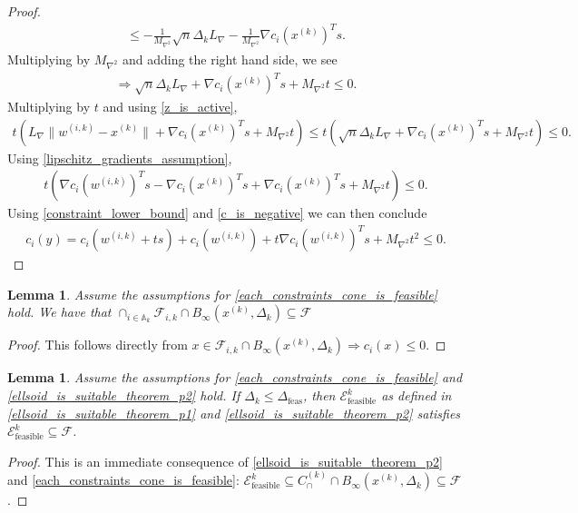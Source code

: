 \documentclass{article}
\newtheorem{lemma}[theorem]{Lemma}
\theoremstyle{case}
\newcommand{\activeconstraintsk}{{\mathbb A_{k}}}
\newcommand{\capcones}{{C^{(k)}_{\cap}}}
\newcommand{\dfeas}{{\Delta_{\text{feas}}}}
\newcommand{\dk}{\Delta_k}
\newcommand{\feasible}{{\mathcal F}}
\newcommand{\fik}{{\mathcal F_{i, k}}}
\newcommand{\lipgrad}{{L_{\nabla}}}
\newcommand{\maxhessian}{{M_{\nabla^2}}}
\newcommand{\tr}{{ B_{\infty}\left(\xk, \dk\right) }}
\newcommand{\unshiftedellipsoid}{{\mathcal E^k_{\text{feasible}}}}
\newcommand{\wik}{{w^{(i, k)}}}
\newcommand{\xk}{{x^{(k)}}}
\begin{document}
\begin{proof}
\begin{align*}
\le -\frac 1 \maxhessian \sqrt{n}\dk \lipgrad -\frac 1 \maxhessian \nabla c_i(\xk)^Ts.
\end{align*}
Multiplying by $\maxhessian$ and adding the right hand side, we see
\begin{align*}
\Longrightarrow \sqrt{n}\dk \lipgrad + \nabla c_i(\xk)^Ts + \maxhessian t \le 0.
\end{align*}
Multiplying by $t$ and using \cref{z_is_active},
\begin{align*}
 t \left(\lipgrad\|\wik - \xk\| + \nabla c_i(\xk)^Ts + \maxhessian t\right) \le t \left(\sqrt{n}\dk \lipgrad + \nabla c_i(\xk)^Ts + \maxhessian t\right) \le 0.
\end{align*}
Using \cref{lipschitz_gradients_assumption},
\begin{align*}
t \left(\nabla c_i(\wik)^Ts - \nabla c_i(\xk)^Ts + \nabla c_i(\xk)^Ts + \maxhessian t\right) \le 0.
\end{align*}
Using \cref{constraint_lower_bound} and \cref{c_is_negative} we can then conclude
\begin{align*}
c_i(y) = c_i(\wik + ts) + c_i(\wik) + t\nabla c_i(\wik)^Ts + \maxhessian t^2 \le 0.
\end{align*}

\end{proof}




\begin{lemma}
\label{cone_and_tr_are_feasible}
Assume the assumptions for \cref{each_constraints_cone_is_feasible} hold.
We have that $\cap_{i \in \activeconstraintsk} \fik \cap \tr \subseteq \feasible$ 
\end{lemma}


\begin{proof}
This follows directly from $x \in \fik \cap \tr \Longrightarrow c_i(x) \le 0$.
\end{proof}


\begin{lemma}
\label{ellipsoid_is_feaisble}
Assume the assumptions for \cref{each_constraints_cone_is_feasible} and \cref{ellsoid_is_suitable_theorem_p2} hold.
If $\dk \le \dfeas$, then $\unshiftedellipsoid$ as defined in \cref{ellsoid_is_suitable_theorem_p1} and \cref{ellsoid_is_suitable_theorem_p2} satisfies
$\unshiftedellipsoid \subseteq \feasible$.
\end{lemma}

\begin{proof}
This is an immediate consequence of \cref{ellsoid_is_suitable_theorem_p2} and \cref{each_constraints_cone_is_feasible}:
$\unshiftedellipsoid \subseteq \capcones \cap \tr \subseteq \feasible$.
\end{proof}
\end{document}

